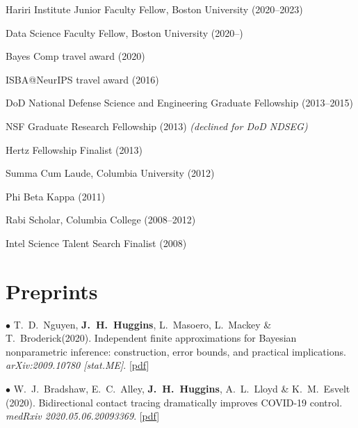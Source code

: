 \documentclass[margin,line]{res}
\newenvironment{list1}{
  \begin{list}{\ding{113}}{%
      \setlength{\itemsep}{0in}
      \setlength{\parsep}{0in} \setlength{\parskip}{0in}
      \setlength{\topsep}{0in} \setlength{\partopsep}{0in}
      \setlength{\leftmargin}{0in}}}{\end{list}} %
\newcommand{\me}{\textbf{J.~H.~Huggins}\xspace}
\newcommand{\tamara}{T.~Broderick\xspace}
\newcommand{\paperref}[1]{[\href{#1}{pdf}]}
\newcommand{\paperref}[1]{}
\begin{document}
\begin{resume}
\begin{list1}
\item[] Hariri Institute Junior Faculty Fellow, Boston University (2020--2023)
\item[] Data Science Faculty Fellow, Boston University (2020--)
\item[] Bayes Comp travel award (2020)
\item[] ISBA@NeurIPS travel award (2016)
\item[] DoD National Defense Science and Engineering Graduate Fellowship (2013--2015)
\item[] NSF Graduate Research Fellowship (2013) {\em (declined for DoD NDSEG)}
\item[] Hertz Fellowship Finalist (2013)
\item[] Summa Cum Laude, Columbia University (2012)
\item[] Phi Beta Kappa (2011)
\item[] Rabi Scholar, Columbia College (2008--2012)
\item[] Intel Science Talent Search Finalist (2008)
\end{list1}



%
%


\section{\sc Preprints}

$\bullet$ T.~D.~Nguyen, \me, L.~Masoero, L.~Mackey \& \tamara (2020).
Independent finite approximations for Bayesian nonparametric inference: construction, error bounds, and practical implications.
\emph{arXiv:2009.10780 [stat.ME]}.
\paperref{https://arxiv.org/abs/2009.10780}

$\bullet$ W.\ J.\ Bradshaw, E.\ C.\ Alley, \me, A.\ L.\ Lloyd \& K.\ M.\ Esvelt (2020).
Bidirectional contact tracing dramatically improves COVID-19 control.
\emph{medRxiv 2020.05.06.20093369}.
\paperref{https://doi.org/10.1101/2020.05.06.20093369}


\end{resume}
\end{document}
